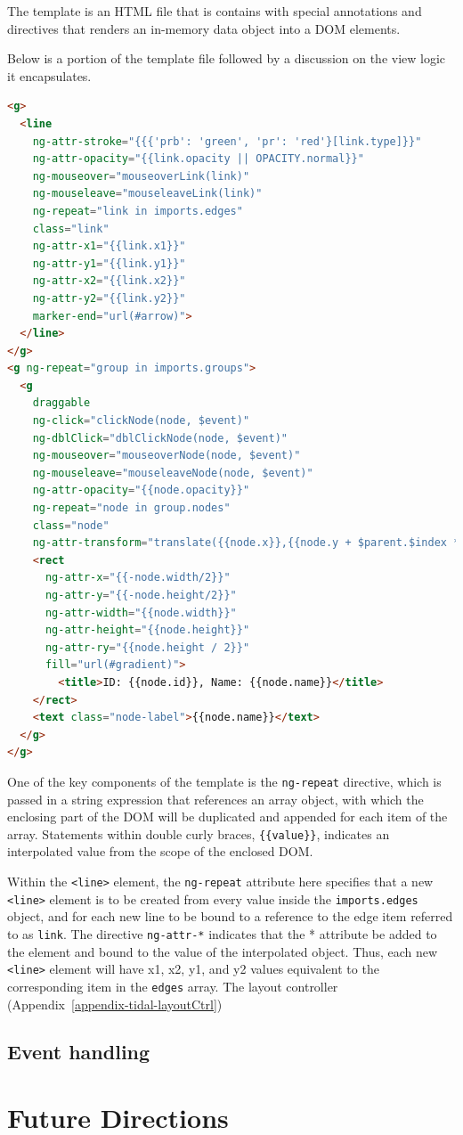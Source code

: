 The template is an HTML file that is contains with special annotations and directives that renders an in-memory data object into a DOM elements.

Below is a portion of the template file followed by a discussion on the view logic it encapsulates.

\begin{lstlisting}[language=html]
<g>
  <line
    ng-attr-stroke="{{{'prb': 'green', 'pr': 'red'}[link.type]}}"
    ng-attr-opacity="{{link.opacity || OPACITY.normal}}"
    ng-mouseover="mouseoverLink(link)"
    ng-mouseleave="mouseleaveLink(link)"
    ng-repeat="link in imports.edges"
    class="link"
    ng-attr-x1="{{link.x1}}"
    ng-attr-y1="{{link.y1}}"
    ng-attr-x2="{{link.x2}}"
    ng-attr-y2="{{link.y2}}"
    marker-end="url(#arrow)">
  </line>
</g>
<g ng-repeat="group in imports.groups">
  <g
    draggable
    ng-click="clickNode(node, $event)"
    ng-dblClick="dblClickNode(node, $event)"
    ng-mouseover="mouseoverNode(node, $event)"
    ng-mouseleave="mouseleaveNode(node, $event)"
    ng-attr-opacity="{{node.opacity}}"
    ng-repeat="node in group.nodes"
    class="node"
    ng-attr-transform="translate({{node.x}},{{node.y + $parent.$index * imports.subgraph.height}})">
    <rect
      ng-attr-x="{{-node.width/2}}"
      ng-attr-y="{{-node.height/2}}"
      ng-attr-width="{{node.width}}"
      ng-attr-height="{{node.height}}"
      ng-attr-ry="{{node.height / 2}}"
      fill="url(#gradient)">
        <title>ID: {{node.id}}, Name: {{node.name}}</title>
    </rect>
    <text class="node-label">{{node.name}}</text>
  </g>
</g>

\end{lstlisting}

One of the key components of the template is the \texttt{ng-repeat} directive, which is passed in a string expression that references an array object, with which the enclosing part of the DOM will be duplicated and appended for each item of the array.
Statements within double curly braces, \texttt{\{\{value\}\}}, indicates an interpolated value from the scope of the enclosed DOM.

Within the \texttt{<line>} element, the \texttt{ng-repeat} attribute here specifies that a new \texttt{<line>} element is to be created from every value inside the \texttt{imports.edges} object, and for each new line to be bound to a reference to the edge item referred to as \texttt{link}.
The directive \texttt{ng-attr-*} indicates that the * attribute be added to the element and bound to the value of the interpolated object.
Thus, each new \texttt{<line>} element will have x1, x2, y1, and y2 values equivalent to the corresponding item in the \texttt{edges} array.
The layout controller (Appendix~\ref{appendix-tidal-layoutCtrl}) 


\subsection{Event handling}

\section{Future Directions}


